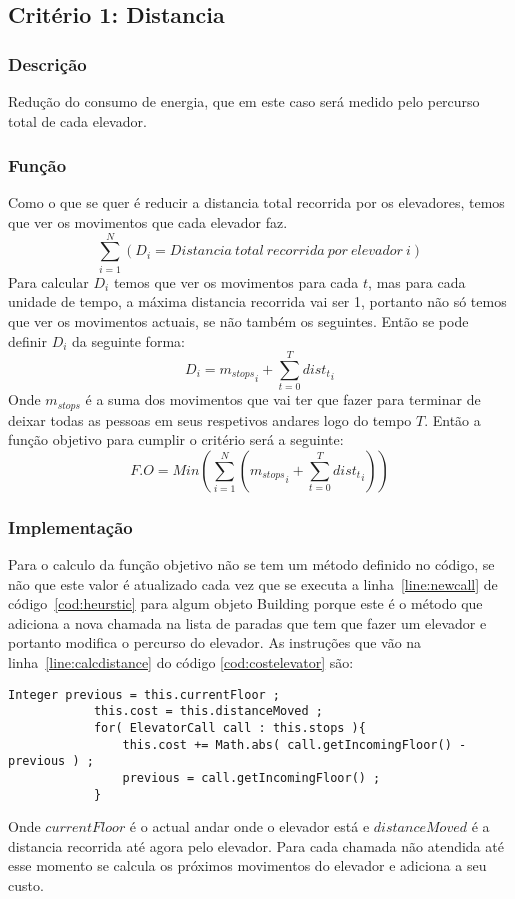 \subsection{Critério 1: Distancia}
	\label{subsec:distancia}
	\subsubsection{Descrição}
		Redução do consumo de energia, que em este caso será medido pelo percurso total de cada elevador.
	\subsubsection{Função}
	\label{subsec:funcaoDist}
		Como o que se quer é reducir a distancia total recorrida por os elevadores, temos que ver os movimentos que cada elevador faz.
		\[
			\sum_{i=1}^{N}( D_i = Distancia\ total\ recorrida\ por\ elevador\ i )
		\]
		Para calcular $D_i$ temos que ver os movimentos para cada $t$, mas para cada unidade de tempo, a máxima distancia recorrida vai ser 1, portanto não só temos que ver os movimentos actuais, se não também os seguintes. Então se pode definir $D_i$ da seguinte forma:
		\[
			D_i = {m_{stops}}_i + \sum_{t=0}^{T}{dist_t}_i
		\]
		Onde $m_{stops}$ é a suma dos movimentos que vai ter que fazer para terminar de deixar todas as pessoas em seus respetivos andares logo do tempo $T$.
		Então a função objetivo para cumplir o critério será a seguinte:
		\[
			F.O = Min( \sum_{i=1}^{N}( {m_{stops}}_i + \sum_{t=0}^{T}{dist_t}_i ) )
		\]
	\subsubsection{Implementação}
		Para o calculo da função objetivo não se tem um método definido no código, se não que este valor é atualizado cada vez que se executa a linha~\ref{line:newcall} de código~\ref{cod:heurstic} para algum objeto Building porque este é o método que adiciona a nova chamada na lista de paradas que tem que fazer um elevador e portanto modifica o percurso do elevador. As instruções que vão na linha~\ref{line:calcdistance} do código \ref{cod:costelevator} são:
		\begin{lstlisting}[caption = Calculo de custo por percurso do elevador, label = cod:calcdistance]
			Integer previous = this.currentFloor ;
			this.cost = this.distanceMoved ;
			for( ElevatorCall call : this.stops ){
				this.cost += Math.abs( call.getIncomingFloor() - previous ) ;
				previous = call.getIncomingFloor() ;
			}
		\end{lstlisting}
		Onde ${currentFloor}$ é o actual andar onde o elevador está e ${distanceMoved}$ é a distancia recorrida até agora pelo elevador. Para cada chamada não atendida até esse momento se calcula os próximos movimentos do elevador e adiciona a seu custo.
		
